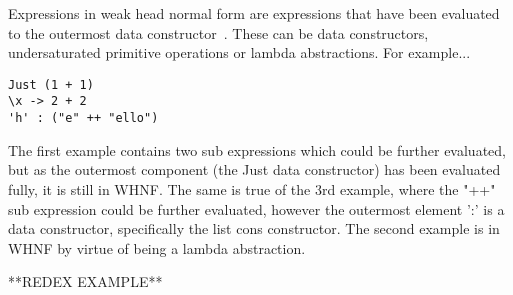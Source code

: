 Expressions in weak head normal form are expressions that have been evaluated
to the outermost data constructor~\cite[pp.198]{SPJ}. These can be data constructors, undersaturated
primitive operations or lambda abstractions. For example...
\begin{verbatim}
Just (1 + 1)
\x -> 2 + 2
'h' : ("e" ++ "ello")
\end{verbatim}
The first example contains two sub expressions which could be further evaluated,
but as the outermost component (the Just data constructor) has been evaluated 
fully, it is still in WHNF. The same is true of the 3rd example, where the "++"
sub expression could be further evaluated, however the outermost element
':' is a data constructor, specifically the list cons constructor. The second
example is in WHNF by virtue of being a lambda abstraction.


**REDEX EXAMPLE**

